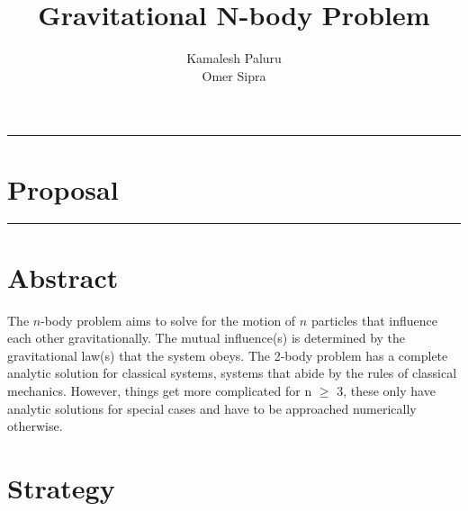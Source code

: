 \documentclass[hidelinks, 11pt, dvipsnames]{article}
\title{Gravitational N-body Problem}
\author{Kamalesh Paluru \\ Omer Sipra}
\newcommand{\psection}[1]{{
    \begin{center}
        \noindent \rule{17cm}{0.4pt}
            \section*{\LARGE #1}
        \noindent \rule{17cm}{0.4pt}
    \end{center}
}}
\newcommand{\psubsection}[1]{{\section*{#1}}}
\begin{document}
\maketitle

\newpage

\psection{Proposal}

\psubsection{Abstract}

\noindent
The $n$-body problem aims to solve for the motion of $n$ particles that influence each other gravitationally. The mutual influence(s) is determined by the gravitational law(s) that the system obeys. The 2-body problem has a complete analytic solution for classical systems, systems that abide by the rules of classical mechanics. However, things get more complicated for n $\ge$ 3, these only have analytic solutions for special cases and have to be approached numerically otherwise. \\

\psubsection{Strategy}
\end{document}
